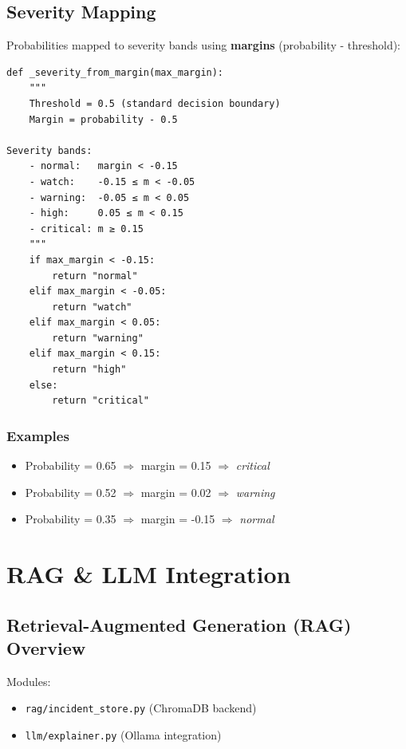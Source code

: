 \documentclass[11pt,a4paper,oneside]{report}
\begin{document}
\section{Severity Mapping}

Probabilities mapped to severity bands using \textbf{margins} (probability - threshold):

\begin{lstlisting}
def _severity_from_margin(max_margin):
    """
    Threshold = 0.5 (standard decision boundary)
    Margin = probability - 0.5

Severity bands:
    - normal:   margin < -0.15
    - watch:    -0.15 ≤ m < -0.05
    - warning:  -0.05 ≤ m < 0.05
    - high:     0.05 ≤ m < 0.15
    - critical: m ≥ 0.15
    """
    if max_margin < -0.15:
        return "normal"
    elif max_margin < -0.05:
        return "watch"
    elif max_margin < 0.05:
        return "warning"
    elif max_margin < 0.15:
        return "high"
    else:
        return "critical"
\end{lstlisting}

\subsection{Examples}

\begin{itemize}
    \item Probability = 0.65 $\Rightarrow$ margin = 0.15 $\Rightarrow$ \textit{critical}
    \item Probability = 0.52 $\Rightarrow$ margin = 0.02 $\Rightarrow$ \textit{warning}
    \item Probability = 0.35 $\Rightarrow$ margin = -0.15 $\Rightarrow$ \textit{normal}
\end{itemize}

\newpage

\chapter{RAG \& LLM Integration}

\section{Retrieval-Augmented Generation (RAG) Overview}

Modules:
\begin{itemize}
    \item \texttt{rag/incident\_store.py} (ChromaDB backend)
    \item \texttt{llm/explainer.py} (Ollama integration)
\end{itemize}
\end{document}
